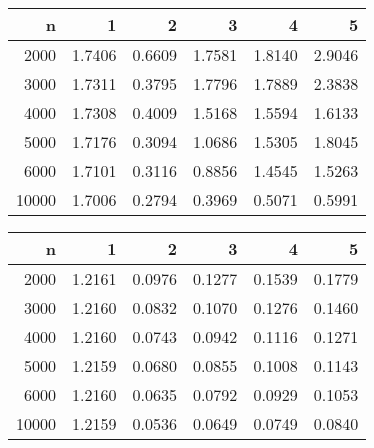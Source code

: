 \begin{table}[ht]
\centering
\begin{tabular}{rrrrrr}
  \hline
n & 1 & 2 & 3 & 4 & 5 \\ 
  \hline
2000 & 1.7406 & 0.6609 & 1.7581 & 1.8140 & 2.9046 \\ 
  3000 & 1.7311 & 0.3795 & 1.7796 & 1.7889 & 2.3838 \\ 
  4000 & 1.7308 & 0.4009 & 1.5168 & 1.5594 & 1.6133 \\ 
  5000 & 1.7176 & 0.3094 & 1.0686 & 1.5305 & 1.8045 \\ 
  6000 & 1.7101 & 0.3116 & 0.8856 & 1.4545 & 1.5263 \\ 
  10000 & 1.7006 & 0.2794 & 0.3969 & 0.5071 & 0.5991 \\ 
   \hline
\end{tabular}
\end{table}
\begin{table}[ht]
\centering
\begin{tabular}{rrrrrr}
  \hline
n & 1 & 2 & 3 & 4 & 5 \\ 
  \hline
2000 & 1.2161 & 0.0976 & 0.1277 & 0.1539 & 0.1779 \\ 
  3000 & 1.2160 & 0.0832 & 0.1070 & 0.1276 & 0.1460 \\ 
  4000 & 1.2160 & 0.0743 & 0.0942 & 0.1116 & 0.1271 \\ 
  5000 & 1.2159 & 0.0680 & 0.0855 & 0.1008 & 0.1143 \\ 
  6000 & 1.2160 & 0.0635 & 0.0792 & 0.0929 & 0.1053 \\ 
  10000 & 1.2159 & 0.0536 & 0.0649 & 0.0749 & 0.0840 \\ 
   \hline
\end{tabular}
\end{table}
